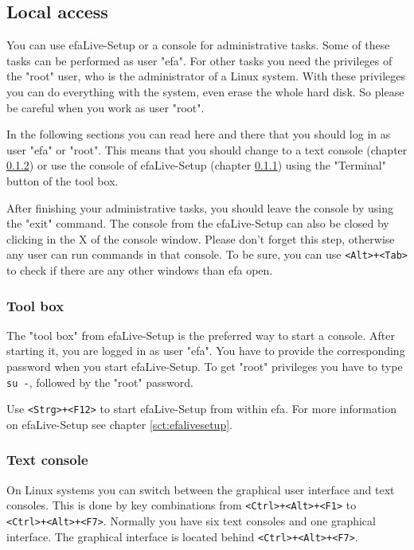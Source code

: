 \documentclass[a4paper,12pt,twoside]{article}
\begin{document}
\subsection{Local access}
\label{sct:local_access}
You can use efaLive-Setup or a console for
administrative tasks. Some of these tasks can be performed as user
"efa". For other tasks you need the
privileges of the "root" user, who is the
administrator of a Linux system. With these privileges you can do
everything with the system, even erase the whole hard disk. So please
be careful when you work as user "root".

In the following sections you can read here and there that you should
log in as user "efa" or
"root". This means that you should change
to a text console (chapter \ref{sct:text_console}) or use
the console of efaLive-Setup (chapter \ref{sct:toolbox})
using the "Terminal" button of the tool
box.

After finishing your administrative tasks, you should leave the console
by using the "exit" command. The console
from the efaLive-Setup can also be closed by clicking in the X of the
console window. Please don't forget this step,
otherwise any user can run commands in that console. To be sure, you
can use \texttt{{\textless}Alt{\textgreater}+{\textless}Tab{\textgreater}} to
check if there are any other windows than efa open.


\subsubsection{Tool box}
\label{sct:toolbox}
The "tool box" from efaLive-Setup is the preferred way to start a
console. After starting it, you are logged in as user
"efa". You have to provide the
corresponding password when you start efaLive-Setup. To get
"root" privileges you have to type
\texttt{su -}, followed by the
"root" password.

Use \texttt{{\textless}Strg{\textgreater}+{\textless}F12{\textgreater}} to start
efaLive-Setup from within efa. For more information on efaLive-Setup
see chapter \ref{sct:efalivesetup}.

\subsubsection{Text console}
\label{sct:text_console}
On Linux systems you can switch
between the graphical user interface and text consoles. This is done by
key combinations from
\texttt{{\textless}Ctrl{\textgreater}+{\textless}Alt{\textgreater}+{\textless}F1{\textgreater}} to\\
\texttt{{\textless}Ctrl{\textgreater}+{\textless}Alt{\textgreater}+{\textless}F7{\textgreater}}.
Normally you have six text consoles and one graphical interface. The graphical interface is located behind \texttt{{\textless}Ctrl{\textgreater}+{\textless}Alt{\textgreater}+{\textless}F7{\textgreater}}.
\end{document}
